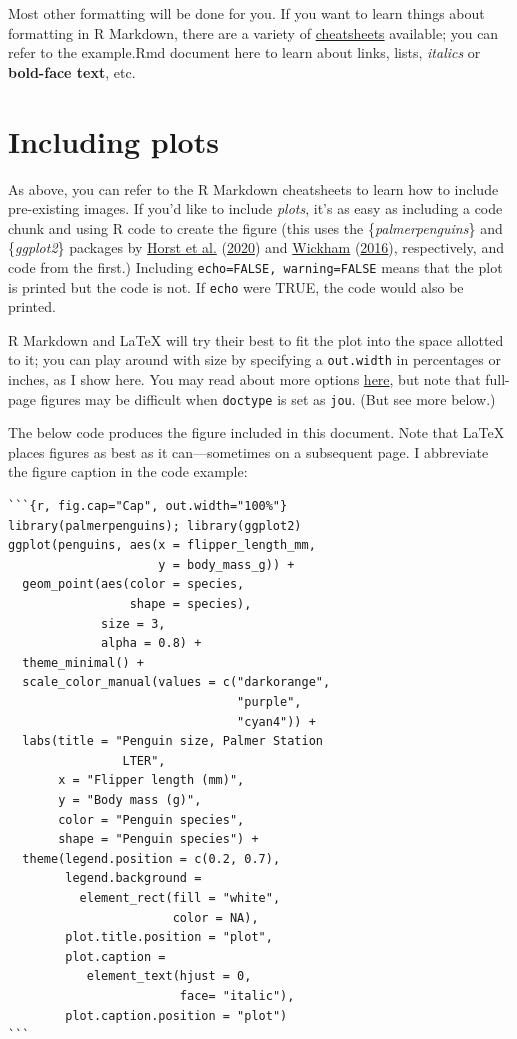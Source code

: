 \documentclass[jou]{apa7}
\begin{document}
Most other formatting will be done for you. If you want to learn things
about formatting in R Markdown, there are a variety of
\href{https://rmarkdown.rstudio.com/lesson-15.html}{cheatsheets}
available; you can refer to the example.Rmd document here to learn about
links, lists, \emph{italics} or \textbf{bold-face text}, etc.

\hypertarget{including-plots}{%
\section{Including plots}\label{including-plots}}

As above, you can refer to the R Markdown cheatsheets to learn how to
include pre-existing images. If you'd like to include \emph{plots}, it's
as easy as including a code chunk and using R code to create the figure
(this uses the \{\emph{palmerpenguins}\} and \{\emph{ggplot2}\} packages
by \protect\hyperlink{ref-horst2020}{Horst et al.}
(\protect\hyperlink{ref-horst2020}{2020}) and
\protect\hyperlink{ref-wickham2016}{Wickham}
(\protect\hyperlink{ref-wickham2016}{2016}), respectively, and code from
the first.) Including \texttt{echo=FALSE,\ warning=FALSE} means that the
plot is printed but the code is not. If \texttt{echo} were TRUE, the
code would also be printed.

R Markdown and LaTeX will try their best to fit the plot into the space
allotted to it; you can play around with size by specifying a
\texttt{out.width} in percentages or inches, as I show here. You may
read about more options
\href{https://bookdown.org/yihui/rmarkdown/pdf-document.html\#figure-options-1}{here},
but note that full-page figures may be difficult when \texttt{doctype}
is set as \texttt{jou}. (But see more below.)

The below code produces the figure included in this document. Note that
LaTeX places figures as best as it can---sometimes on a subsequent page.
I abbreviate the figure caption in the code example:

\begin{verbatim}
```{r, fig.cap="Cap", out.width="100%"}
library(palmerpenguins); library(ggplot2)
ggplot(penguins, aes(x = flipper_length_mm, 
                     y = body_mass_g)) +
  geom_point(aes(color = species, 
                 shape = species),
             size = 3,
             alpha = 0.8) +
  theme_minimal() +
  scale_color_manual(values = c("darkorange",
                                "purple",
                                "cyan4")) +
  labs(title = "Penguin size, Palmer Station
                LTER",
       x = "Flipper length (mm)",
       y = "Body mass (g)",
       color = "Penguin species",
       shape = "Penguin species") +
  theme(legend.position = c(0.2, 0.7),
        legend.background = 
          element_rect(fill = "white",
                       color = NA),
        plot.title.position = "plot",
        plot.caption = 
           element_text(hjust = 0, 
                        face= "italic"),
        plot.caption.position = "plot")
```
\end{verbatim}
\end{document}

